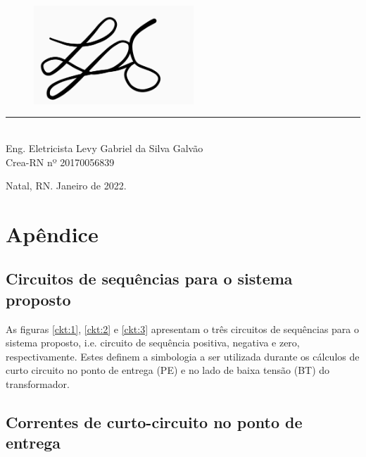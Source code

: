 
\begin{center}
    \mbox{}
    \vfill
    
    
    \begin{figure}[h!]
        \centering
        \includegraphics[width=6cm]{images/ass.png}
        \label{fig:ass}
    \end{figure}
    \noindent\rule{8cm}{0.4pt} \\
    \vspace{0.25cm}
    Eng. Eletricista Levy Gabriel da Silva Galvão \\
    Crea-RN nº 20170056839
    
    \vspace{2.5cm}
    
    Natal, RN. Janeiro de 2022.

\end{center}


\newpage

\section{Apêndice}

\subsection{Circuitos de sequências para o sistema proposto}

As figuras \ref{ckt:1}, \ref{ckt:2} e \ref{ckt:3} apresentam o três circuitos de sequências para o sistema proposto, i.e. circuito de sequência positiva, negativa e zero, respectivamente. Estes definem a simbologia a ser utilizada durante os cálculos de curto circuito no ponto de entrega (PE) e no lado de baixa tensão (BT) do transformador.





\subsection{Correntes de curto-circuito no ponto de entrega}

